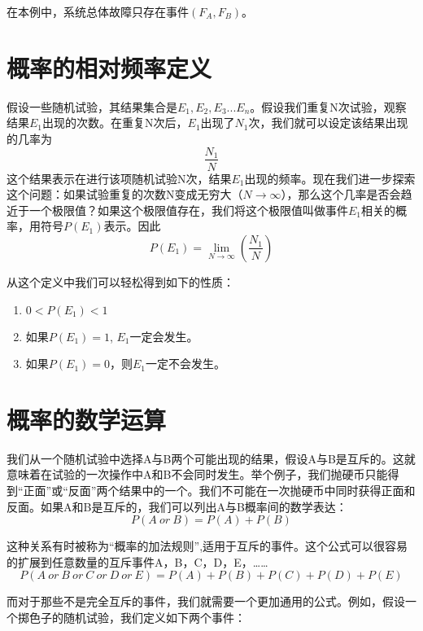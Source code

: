 \documentclass[cn,11pt,chinese]{elegantbook}
\begin{document}
在本例中，系统总体故障只存在事件$(F_A,F_B)$。

\section{概率的相对频率定义}

假设一些随机试验，其结果集合是$E_1,E_2,E_3...E_n$。假设我们重复N次试验，观察结果$E_1$出现的次数。在重复N次后，$E_1$出现了$N_1$次，我们就可以设定该结果出现的几率为
$$\frac{N_1}{N}$$
这个结果表示在进行该项随机试验N次，结果$E_1$出现的频率。现在我们进一步探索这个问题：如果试验重复的次数N变成无穷大（$N\to \infty$），那么这个几率是否会趋近于一个极限值？如果这个极限值存在，我们将这个极限值叫做事件$E_1$相关的概率，用符号$P(E_1)$表示。因此
\begin{equation}
P(E_1)=\lim_{N \to \infty}(\frac{N_1}{N})
\label{eq:eq1}
\end{equation}

从这个定义中我们可以轻松得到如下的性质：

\begin{enumerate}
	\item $0<P(E_1)<1$
	\item 如果$P(E_1)=1$, $E_1$一定会发生。
	\item 如果$P(E_1)=0$，则$E_1$一定不会发生。
\end{enumerate}

\section{概率的数学运算}

我们从一个随机试验中选择A与B两个可能出现的结果，假设A与B是互斥的。这就意味着在试验的一次操作中A和B不会同时发生。举个例子，我们抛硬币只能得到“正面”或“反面”两个结果中的一个。我们不可能在一次抛硬币中同时获得正面和反面。如果A和B是互斥的，我们可以列出A与B概率间的数学表达：
\begin{equation}
P(A\ or \ B)=P(A)+P(B)
\label{eq:eq2}
\end{equation}

这种关系有时被称为“概率的加法规则”,适用于互斥的事件。这个公式可以很容易的扩展到任意数量的互斥事件A，B，C，D，E，……
\begin{equation}
	P(A\ or\ B \ or \ C \ or\ D\ or \ E)=P(A)+P(B)+P(C)+P(D)+P(E) 
	\label{eq:eq3}
\end{equation}

而对于那些不是完全互斥的事件，我们就需要一个更加通用的公式。例如，假设一个掷色子的随机试验，我们定义如下两个事件：
\end{document}
